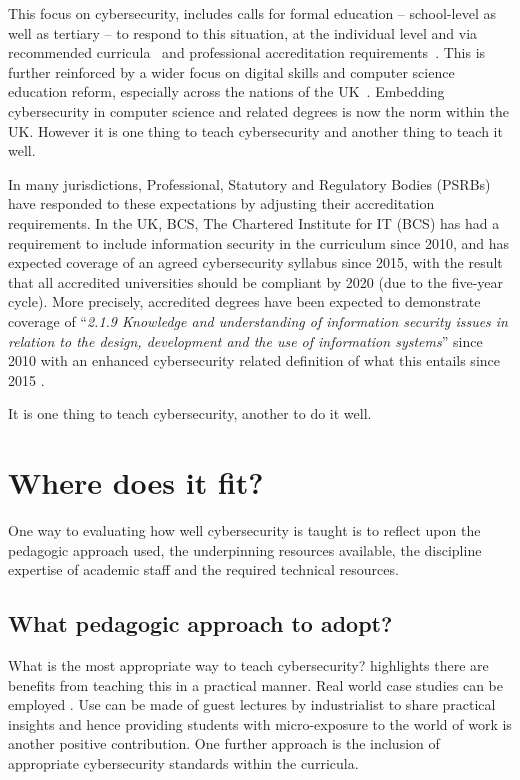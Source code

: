 \documentclass[sigconf]{acmart}
\begin{document}
This focus on cybersecurity, includes calls for formal education -- school-level as well as tertiary -- to respond to this situation, at the individual level and via recommended curricula~\cite{mcgettrick-et-al:sigcse2014,ACM2017b} and professional accreditation requirements~\cite{BCS2018a,NCSC2017}. This is further reinforced by a wider focus on digital skills and computer science education reform, especially across the nations of the UK~\cite{brown-et-al:toce2014,murphy-et-al:programming2017,tryfonas+crick:petra2018}. Embedding cybersecurity in computer science and related degrees is now the norm within the UK. However it is one thing to teach cybersecurity and another thing to teach it well. 

In many jurisdictions, Professional, Statutory and Regulatory Bodies (PSRBs) have responded to these expectations by adjusting their accreditation requirements. In the UK, BCS, The Chartered Institute for IT (BCS) has had a requirement to include information security in the curriculum since 2010, and has expected coverage of an agreed cybersecurity syllabus since 2015, with the result that all accredited universities should be compliant by 2020 (due to the five-year cycle). More precisely, accredited degrees have been expected to demonstrate coverage of ``{\emph{2.1.9 Knowledge and understanding of information security issues in relation to the design, development and the use of information systems}}'' \cite[p.~30]{BCS2018a} since 2010 with an enhanced cybersecurity related definition of what this entails since 2015 \cite[p.~17--18]{BCS2018a}.

It is one thing to teach cybersecurity, another to do it well. %

\section {Where does it fit?	}


One way to evaluating how well cybersecurity is taught is to reflect upon the pedagogic approach used, the underpinning resources available, the discipline expertise of academic staff and the required technical resources.

\subsection{What pedagogic approach to adopt? }
What is the most appropriate way to teach cybersecurity? \cite{Weiss:2013:THC:2527148.2527180} highlights there are benefits from teaching this in a practical manner. Real world case studies can be employed \cite{BritishAirways2018a}. Use can be made of guest lectures by industrialist to share practical insights and hence providing students with micro-exposure to the world of work is another positive contribution. One further approach is the inclusion of appropriate cybersecurity standards within the curricula.
\end{document}
